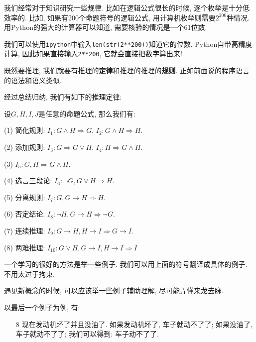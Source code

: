 我们经常对于知识研究一些规律. 比如在逻辑公式很长的时候, 逐个枚举是十分低效率的. 比如, 如果有200个命题符号的逻辑公式, 用计算机枚举则需要$2^{200}$种情况. 用Python的强大的计算器可以知道, 需要核验的情况是一个61位数.

\begin{example}
	我们可以使用\texttt{ipython}中输入\texttt{len(str(2**200))}知道它的位数. Python自带高精度计算, 因此如果直接输入\texttt{2**200}, 它就会直接把数字算出来! 
\end{example} 

既然要推理, 我们就要有推理的\textbf{定律}和推理的推理的\textbf{规则}. 正如前面说的程序语言的语法和语义类似. 

经过总结归纳, 我们有如下的推理定律: 

\begin{theorem}[常见的推理定律]
	设$G,H,I,J$是任意的命题公式, 那么我们有: 
	
	(1) 简化规则: $I_1:G\land H\Rightarrow G$, $I_2: G\land H \Rightarrow H$.
	
	(2) 添加规则: $I_3:G\Rightarrow G\lor H$, $I_4: H\Rightarrow G\land H$.
	
	(3) $I_5: G,H\Rightarrow G\land H$.
	
	(4) 选言三段论: $I_6: \lnot G, G\lor H \Rightarrow H$.
	
	(5) 分离规则: $I_7: G,G\to H\Rightarrow H$.
	
	(6) 否定结论: $I_8: \lnot H, G\to H\Rightarrow \lnot G$.
	
	(7) 连续推理: $I_9: G\to H, H\to I\Rightarrow G\to I$.
	
	(8) 两难推理: $I_10: G\lor H,G\to I, H\to I\Rightarrow I$

\end{theorem}

一个学习的很好的方法是举一些例子. 我们可以用上面的符号翻译成具体的例子. 不用太过于拘束.  

\begin{idea}
	遇见新概念的时候, 可以应该举一些例子辅助理解, 尽可能弄懂来龙去脉. 
\end{idea}

以最后一个例子为例, 有: 

\begin{example}
	\begin{itemize}
		\item[8] 现在发动机坏了并且没油了. 如果发动机坏了, 车子就动不了了; 如果没油了, 车子就动不了了; 我们可以得到: 车子动不了了. 
	\end{itemize}
\end{example}

